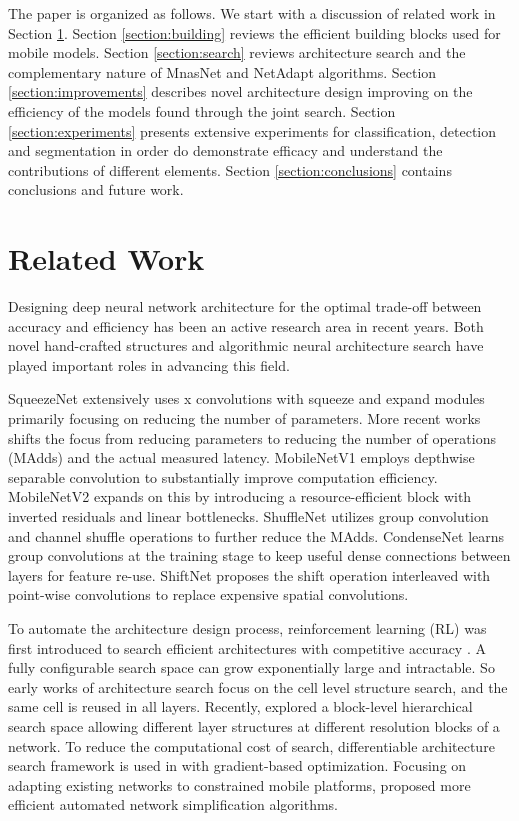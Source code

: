\documentclass[10pt,twocolumn,letterpaper]{article}
\begin{document}
The paper is organized as follows. We start with a discussion of related work in Section \ref{section:related}. Section \ref{section:building} reviews the efficient building blocks used for mobile models. Section \ref{section:search} reviews architecture search and the complementary nature of MnasNet and NetAdapt algorithms. Section \ref{section:improvements} describes novel architecture design improving on the efficiency of the models found through the joint search. Section \ref{section:experiments} presents extensive experiments for classification, detection and segmentation in order do demonstrate efficacy and understand the contributions of different elements. Section \ref{section:conclusions} contains conclusions and future work.

\section{Related Work}
\label{section:related}
Designing deep neural network architecture for the optimal trade-off between accuracy and efficiency has been an active research area
in recent years. Both novel hand-crafted structures and algorithmic neural architecture search have played important roles in advancing this field.

SqueezeNet\cite{SqueezeNet} extensively uses x convolutions with squeeze and expand modules primarily focusing on reducing the number of parameters. More recent works shifts the focus from reducing parameters to reducing the number of operations (MAdds) and the actual measured latency. MobileNetV1\cite{MobilenetV1} employs depthwise separable convolution to substantially improve computation efficiency. MobileNetV2\cite{mobilenetv2} expands on this by introducing a resource-efficient block with inverted residuals and linear bottlenecks. ShuffleNet\cite{ShuffleNet2017} utilizes group convolution and channel shuffle operations to further reduce the MAdds. CondenseNet\cite{CondenseNet} learns group convolutions at the training stage to keep useful dense connections between layers for feature re-use. ShiftNet\cite{Shift} proposes the shift operation interleaved with point-wise convolutions to replace expensive spatial convolutions.

To automate the architecture design process, reinforcement learning (RL) was first introduced to search efficient architectures with competitive accuracy \cite{NAS_reinforcement,LearningToLearnScale,BakerGNR16,ProgressiveNAS,ENAS}. A fully configurable search space can grow exponentially large and intractable. So early works of architecture search focus on the cell level structure search, and the same cell is reused in all layers. Recently, \cite{mnasnet} explored a block-level hierarchical search space allowing different layer structures at different resolution blocks of a network. To reduce the computational cost of search, differentiable architecture search framework is used in \cite{DARTS,proxyless,FBnet} with gradient-based optimization. Focusing on adapting existing networks to constrained mobile platforms, \cite{NetAdapt,AMC,ChamNet} proposed more efficient automated network simplification algorithms.
\end{document}
